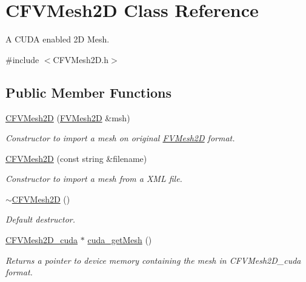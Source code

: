 \hypertarget{classFVL_1_1CFVMesh2D}{
\section{CFVMesh2D Class Reference}
\label{da/d8d/classFVL_1_1CFVMesh2D}
}


A CUDA enabled 2D Mesh.  




{\ttfamily \#include $<$CFVMesh2D.h$>$}

\subsection*{Public Member Functions}
\begin{DoxyCompactItemize}
\item 
\hyperlink{classFVL_1_1CFVMesh2D_aa7a00d0164463a128c305eff51e3218d}{CFVMesh2D} (\hyperlink{classFVMesh2D}{FVMesh2D} \&msh)
\begin{DoxyCompactList}\small\item\em Constructor to import a mesh on original \hyperlink{classFVMesh2D}{FVMesh2D} format. \item\end{DoxyCompactList}\item 
\hyperlink{classFVL_1_1CFVMesh2D_a1cac005d50e5d1ed3d3a279bded6560c}{CFVMesh2D} (const string \&filename)
\begin{DoxyCompactList}\small\item\em Constructor to import a mesh from a XML file. \item\end{DoxyCompactList}\item 
\hyperlink{classFVL_1_1CFVMesh2D_a1e8707cd63592ebc0debed957fb072e9}{$\sim$CFVMesh2D} ()
\begin{DoxyCompactList}\small\item\em Default destructor. \item\end{DoxyCompactList}\item 
\hyperlink{structFVL_1_1CFVMesh2D__cuda}{CFVMesh2D\_\-cuda} $\ast$ \hyperlink{classFVL_1_1CFVMesh2D_aff70a3290e7ab4a107038c268bd186d5}{cuda\_\-getMesh} ()
\begin{DoxyCompactList}\small\item\em Returns a pointer to device memory containing the mesh in CFVMesh2D\_\-cuda format. \item\end{DoxyCompactList}\item 

\end{DoxyCompactItemize}
